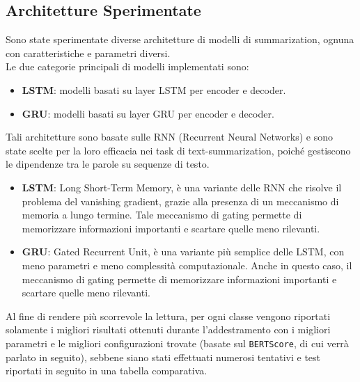 \subsection{Architetture Sperimentate}
Sono state sperimentate diverse architetture di modelli di summarization, ognuna con caratteristiche e parametri diversi.\\
Le due categorie principali di modelli implementati sono:
\begin{itemize}
    \item \textbf{LSTM}: modelli basati su layer LSTM per encoder e decoder.
    \item \textbf{GRU}: modelli basati su layer GRU per encoder e decoder.
\end{itemize}
Tali architetture sono basate sulle RNN (Recurrent Neural Networks) e sono state scelte per la loro efficacia nei task di text-summarization, poiché 
gestiscono le dipendenze tra le parole su sequenze di testo.\\ 
\begin{itemize}
    \item \textbf{LSTM}: Long Short-Term Memory, è una variante delle RNN che risolve il problema del vanishing gradient, grazie alla presenza di un meccanismo di memoria a lungo termine.
    Tale meccanismo di gating permette di memorizzare informazioni importanti e scartare quelle meno rilevanti.
    \item \textbf{GRU}: Gated Recurrent Unit, è una variante più semplice delle LSTM, con meno parametri e meno complessità computazionale.
    Anche in questo caso, il meccanismo di gating permette di memorizzare informazioni importanti e scartare quelle meno rilevanti.
\end{itemize}

Al fine di rendere più scorrevole la lettura, per ogni classe vengono riportati solamente i migliori risultati ottenuti durante l'addestramento con i migliori parametri e le migliori configurazioni trovate (basate sul \texttt{BERTScore}, di cui verrà parlato in seguito), sebbene
siano stati effettuati numerosi tentativi e test riportati in seguito in una tabella comparativa.\\





%
